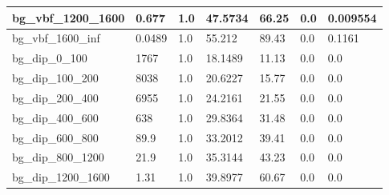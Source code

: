 \documentclass[a4paper, 10pt]{article}
\begin{document}
\begin{table}[H]
\begin{center}
\begin{tabular}{|m{23.0mm}|m{23.0mm}|m{18.0mm}|m{19.0mm}|m{19.0mm}|m{19.0mm}|m{19.0mm}|}
      \hline
      {\cellcolor{white}         bg\_vbf\_1200\_1600}& {\cellcolor{white}         0.677}& {\cellcolor{white}         1.0}& {\cellcolor{white}         47.5734}& {\cellcolor{white}         66.25}& {\cellcolor{green}         0.0}& {\cellcolor{green}         0.009554}\\
      \hline
      {\cellcolor{white}         bg\_vbf\_1600\_inf}& {\cellcolor{white}         0.0489}& {\cellcolor{white}         1.0}& {\cellcolor{white}         55.212}& {\cellcolor{white}         89.43}& {\cellcolor{green}         0.0}& {\cellcolor{green}         0.1161}\\
      \hline
      {\cellcolor{white}         bg\_dip\_0\_100}& {\cellcolor{white}         1767}& {\cellcolor{white}         1.0}& {\cellcolor{white}         18.1489}& {\cellcolor{white}         11.13}& {\cellcolor{green}         0.0}& {\cellcolor{green}         0.0}\\
      \hline
      {\cellcolor{white}         bg\_dip\_100\_200}& {\cellcolor{white}         8038}& {\cellcolor{white}         1.0}& {\cellcolor{white}         20.6227}& {\cellcolor{white}         15.77}& {\cellcolor{green}         0.0}& {\cellcolor{green}         0.0}\\
      \hline
      {\cellcolor{white}         bg\_dip\_200\_400}& {\cellcolor{white}         6955}& {\cellcolor{white}         1.0}& {\cellcolor{white}         24.2161}& {\cellcolor{white}         21.55}& {\cellcolor{green}         0.0}& {\cellcolor{green}         0.0}\\
      \hline
      {\cellcolor{white}         bg\_dip\_400\_600}& {\cellcolor{white}         638}& {\cellcolor{white}         1.0}& {\cellcolor{white}         29.8364}& {\cellcolor{white}         31.48}& {\cellcolor{green}         0.0}& {\cellcolor{green}         0.0}\\
      \hline
      {\cellcolor{white}         bg\_dip\_600\_800}& {\cellcolor{white}         89.9}& {\cellcolor{white}         1.0}& {\cellcolor{white}         33.2012}& {\cellcolor{white}         39.41}& {\cellcolor{green}         0.0}& {\cellcolor{green}         0.0}\\
      \hline
      {\cellcolor{white}         bg\_dip\_800\_1200}& {\cellcolor{white}         21.9}& {\cellcolor{white}         1.0}& {\cellcolor{white}         35.3144}& {\cellcolor{white}         43.23}& {\cellcolor{green}         0.0}& {\cellcolor{green}         0.0}\\
      \hline
      {\cellcolor{white}         bg\_dip\_1200\_1600}& {\cellcolor{white}         1.31}& {\cellcolor{white}         1.0}& {\cellcolor{white}         39.8977}& {\cellcolor{white}         60.67}& {\cellcolor{green}         0.0}& {\cellcolor{green}         0.0}\\

\end{tabular}
\end{center}
\end{table}
\end{document}
